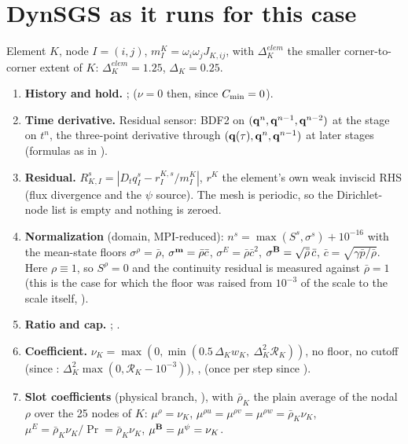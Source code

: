 \documentclass[10pt]{article}
\begin{document}
\section{DynSGS as it runs for this case}
Element $K$, node $I=(i,j)$, $m^K_I=\omega_i\omega_jJ_{K,ij}$, 
with $\Delta^{elem}_K$ the smaller corner-to-corner extent of $K$: $\Delta^{elem}_K=1.25$, $\Delta_K=0.25$.
\begin{enumerate}[leftmargin=*]
\item \textbf{History and hold.} ;  ($\nu=0$ then,
since $C_{\min}=0$).
\item \textbf{Time derivative.} Residual sensor: BDF2 on $(\mathbf{q}^n,\mathbf{q}^{n-1},\mathbf{q}^{n-2})$ at the stage on $t^n$,
the three-point derivative through $(\mathbf{q}(\tau),\mathbf{q}^n,\mathbf{q}^{n-1})$ at later stages (formulas as in
).
\item \textbf{Residual.} $R^s_{K,I}=|D_tq^s_I-r^{K,s}_I/m^K_I|$, $r^K$ the element's own weak
inviscid RHS (flux divergence and the $\psi$ source). The mesh is periodic, so the Dirichlet-node list
is empty and nothing is zeroed.
\item \textbf{Normalization} (domain, MPI-reduced): $n^s=\max(S^s,\sigma^s)+10^{-16}$ with the
mean-state floors $\sigma^\rho=\bar\rho$, $\sigma^{\mathbf{m}}=\bar\rho\bar c$, $\sigma^E=\bar\rho\bar c^2$,
$\sigma^{\mathbf{B}}=\sqrt{\bar\rho}\,\bar c$, $\bar c=\sqrt{\gamma\bar p/\bar\rho}$. Here $\rho\equiv1$, so $S^\rho=0$
and the continuity residual is measured against $\bar\rho=1$ (this is the case for which the floor was
raised from $10^{-3}$ of the scale to the scale itself, ).
\item \textbf{Ratio and cap.} ;\newline
{}.
\item \textbf{Coefficient.} $\nu_K=\max(0,\min(0.5\,\Delta_Kw_K,\ \Delta_K^2\mathcal R_K))$, no floor, no cutoff
(since : $\Delta_K^2\max(0,\mathcal R_K-10^{-3})$), , 
(once per step since ).
\item \textbf{Slot coefficients} (physical branch, ), with $\bar\rho_K$ the plain average of
the nodal $\rho$ over the 25 nodes of $K$:
$\mu^\rho=\nu_K$, $\mu^{\rho u}=\mu^{\rho v}=\mu^{\rho w}=\bar\rho_K\nu_K$, $\mu^E=\bar\rho_K\nu_K/\Pr=\bar\rho_K\nu_K$,
$\mu^{\mathbf{B}}=\mu^\psi=\nu_K$.
\end{enumerate}
\end{document}
